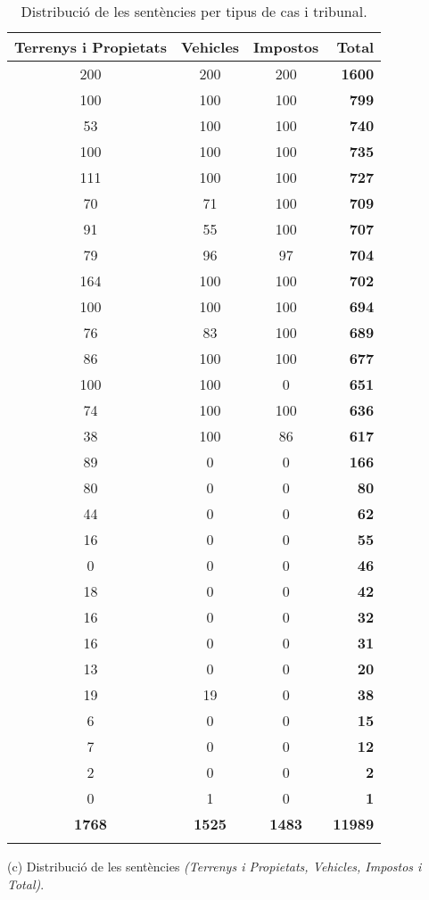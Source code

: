   \begin{table}[H]
    \centering
  \begin{tabular}{ccc|r|}
    \Xhline{2\arrayrulewidth}
      \textbf{Terrenys i Propietats} &
      \textbf{Vehicles} &
      \textbf{Impostos} &
      \textbf{Total} \\
      \hline
    200 & 200 & 200 & \textbf{1600} \\
    100 & 100 & 100 & \textbf{799} \\
    53 & 100 & 100 & \textbf{740} \\
    100 & 100 & 100 & \textbf{735} \\
    111 & 100 & 100 & \textbf{727} \\
    70 & 71 & 100 & \textbf{709} \\
    91 & 55 & 100 & \textbf{707} \\
    79 & 96 & 97 & \textbf{704} \\
    164 & 100 & 100 & \textbf{702} \\
    100 & 100 & 100 & \textbf{694} \\
    76 & 83 & 100 & \textbf{689} \\
    86 & 100 & 100 & \textbf{677} \\
    100 & 100 & 0 & \textbf{651} \\
    74 & 100 & 100 & \textbf{636} \\
    38 & 100 & 86 & \textbf{617} \\
    89 & 0 & 0 & \textbf{166} \\
    80 & 0 & 0 & \textbf{80} \\
    44 & 0 & 0 & \textbf{62} \\
    16 & 0 & 0 & \textbf{55} \\
    0 & 0 & 0 & \textbf{46} \\
    18 & 0 & 0 & \textbf{42} \\
    16 & 0 & 0 & \textbf{32} \\
    16 & 0 & 0 & \textbf{31} \\
    13 & 0 & 0 & \textbf{20} \\
    19 & 19 & 0 & \textbf{38} \\
    6 & 0 & 0 & \textbf{15} \\
    7 & 0 & 0 & \textbf{12} \\
    2 & 0 & 0 & \textbf{2} \\
    0 & 1 & 0 & \textbf{1} \\
    \hline
    \textbf{1768} & \textbf{1525} & \textbf{1483} & \textbf{11989} \\
    \Xhline{2\arrayrulewidth}
      \end{tabular}
    \captionsetup{font=small}
    \caption*{(c) Distribució de les sentències \textit{(Terrenys i Propietats, Vehicles, Impostos i Total)}.}
    \captionsetup{font=normalsize}
  \caption{Distribució de les sentències per tipus de cas i tribunal.}
  \label{tab:distribucio_cas_tribunal}
\end{table}










